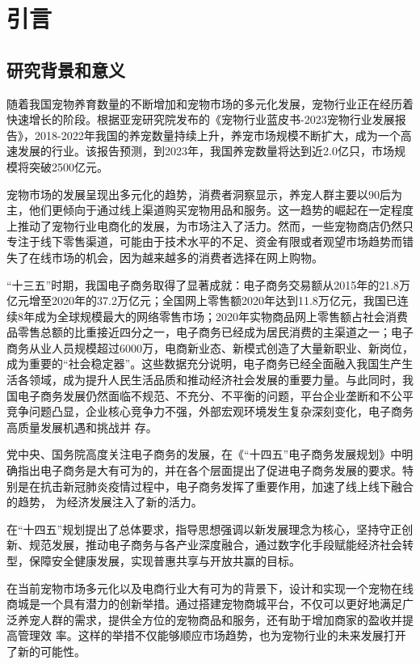 
\chapter{引言}

\section{研究背景和意义}
随着我国宠物养育数量的不断增加和宠物市场的多元化发展，宠物行业正在经历着快速增长的阶段。根据亚宠研究院发布的《宠物行业蓝皮书-2023宠物行业发展报告》，2018-2022年我国的养宠数量持续上升，养宠市场规模不断扩大，成为一个高速发展的行业。该报告预测，到2023年，我国养宠数量将达到近2.0亿只，市场规模将突破2500亿元。

宠物市场的发展呈现出多元化的趋势，消费者洞察显示，养宠人群主要以90后为主，他们更倾向于通过线上渠道购买宠物用品和服务。这一趋势的崛起在一定程度上推动了宠物行业电商化的发展，为市场注入了活力。然而，一些宠物商店仍然只专注于线下零售渠道，可能由于技术水平的不足、资金有限或者观望市场趋势而错失了在线市场的机会，因为越来越多的消费者选择在网上购物。

“十三五”时期，我国电子商务取得了显著成就：电子商务交易额从2015年的21.8万亿元增至2020年的37.2万亿元；全国网上零售额2020年达到11.8万亿元，我国已连续8年成为全球规模最大的网络零售市场；2020年实物商品网上零售额占社会消费品零售总额的比重接近四分之一，电子商务已经成为居民消费的主渠道之一；电子商务从业人员规模超过6000万，电商新业态、新模式创造了大量新职业、新岗位，成为重要的“社会稳定器”。这些数据充分说明，电子商务已经全面融入我国生产生活各领域，成为提升人民生活品质和推动经济社会发展的重要力量。与此同时，我国电子商务发展仍然面临不规范、不充分、不平衡的问题，平台企业垄断和不公平竞争问题凸显，企业核心竞争力不强，外部宏观环境发生复杂深刻变化，电子商务高质量发展机遇和挑战并
存。

党中央、国务院高度关注电子商务的发展，在《“十四五”电子商务发展规划》中明确指出电子商务是大有可为的，并在各个层面提出了促进电子商务发展的要求。特别是在抗击新冠肺炎疫情过程中，电子商务发挥了重要作用，加速了线上线下融合的趋势，
为经济发展注入了新的活力。

在“十四五”规划提出了总体要求，指导思想强调以新发展理念为核心，坚持守正创新、规范发展，推动电子商务与各产业深度融合，通过数字化手段赋能经济社会转型，保障安全健康发展，实现普惠共享与开放共赢的目标。

在当前宠物市场多元化以及电商行业大有可为的背景下，设计和实现一个宠物在线商城是一个具有潜力的创新举措。通过搭建宠物商城平台，不仅可以更好地满足广泛养宠人群的需求，提供全方位的宠物商品和服务，还有助于增加商家的盈收并提高管理效
率。这样的举措不仅能够顺应市场趋势，也为宠物行业的未来发展打开了新的可能性。

